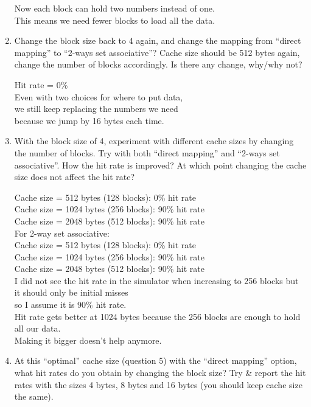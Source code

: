 \documentclass{article}\\
\begin{document}
\begin{enumerate}
    Now each block can hold two numbers instead of one.\\
    This means we need fewer blocks to load all the data.\\

    \item Change the block size back to 4 again, and change the mapping from ``direct mapping'' to ``2-ways set associative''? Cache size should be 512 bytes again, change the number of blocks accordingly. Is there any change, why/why not?
    
    Hit rate = 0\%\\
    
    Even with two choices for where to put data,\\
    we still keep replacing the numbers we need\\
    because we jump by 16 bytes each time.\\

    \item With the block size of 4, experiment with different cache sizes by changing the number of blocks. Try with both ``direct mapping'' and ``2-ways set associative''. How the hit rate is improved? At which point changing the cache size does not affect the hit rate?
    
    Cache size = 512 bytes (128 blocks): 0\% hit rate \\
    Cache size = 1024 bytes (256 blocks): 90\% hit rate \\
    Cache size = 2048 bytes (512 blocks): 90\% hit rate \\
    
    For 2-way set associative:\\
    Cache size = 512 bytes (128 blocks): 0\% hit rate \\
    Cache size = 1024 bytes (256 blocks): 90\% hit rate \\
    Cache size = 2048 bytes (512 blocks): 90\% hit rate \\

    I did not see the hit rate in the simulator when increasing to 256 blocks but it should only be initial misses \\
    so I assume it is 90\% hit rate. \\ 
    Hit rate gets better at 1024 bytes because the 256 blocks are enough to hold all our data.\\
    Making it bigger doesn't help anymore.\\

    \item At this ``optimal'' cache size (question 5) with the ``direct mapping'' option, what hit rates do you obtain by changing the block size? Try \& report the hit rates with the sizes 4 bytes, 8 bytes and 16 bytes (you should keep cache size the same).\\
    

\end{enumerate}
\end{document}
